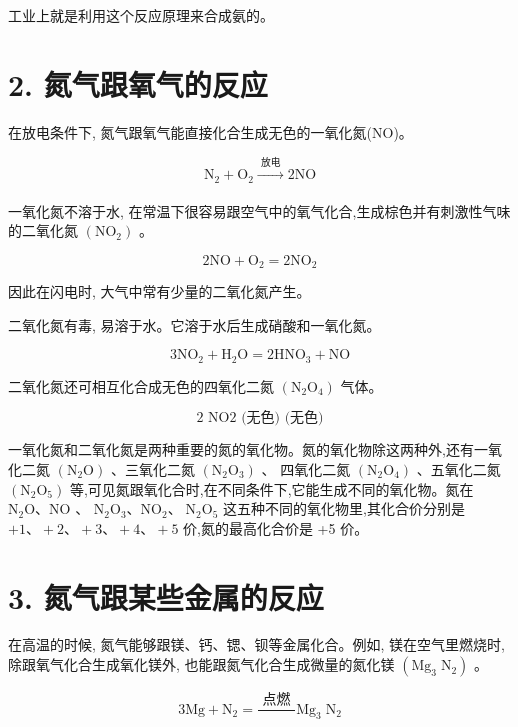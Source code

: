 \documentclass[10pt]{article}
\begin{document}
工业上就是利用这个反应原理来合成氨的。

\section*{2. 氮气跟氧气的反应}

在放电条件下, 氮气跟氧气能直接化合生成无色的一氧化氮(NO)。

\[
{\mathrm{N}}_{2} + {\mathrm{O}}_{2}\xrightarrow[]{\text{ 放电 }}2\mathrm{{NO}}
\]

一氧化氮不溶于水, 在常温下很容易跟空气中的氧气化合,生成棕色并有刺激性气味的二氧化氮 \(\left( {\mathrm{{NO}}}_{2}\right)\) 。

\[
2\mathrm{{NO}} + {\mathrm{O}}_{2} = 2{\mathrm{{NO}}}_{2}
\]

因此在闪电时, 大气中常有少量的二氧化氮产生。

二氧化氮有毒, 易溶于水。它溶于水后生成硝酸和一氧化氮。

\[
3{\mathrm{{NO}}}_{2} + {\mathrm{H}}_{2}\mathrm{O} = 2{\mathrm{{HNO}}}_{3} + \mathrm{{NO}}
\]

二氧化氮还可相互化合成无色的四氧化二氮 \(\left( {{\mathrm{N}}_{2}{\mathrm{O}}_{4}}\right)\) 气体。

\[
\text{2 NO2 (无色) (无色)}
\]

一氧化氮和二氧化氮是两种重要的氮的氧化物。氮的氧化物除这两种外,还有一氧化二氮 \(\left( {{\mathrm{N}}_{2}\mathrm{O}}\right)\) 、三氧化二氮 \(\left( {{\mathrm{N}}_{2}{\mathrm{O}}_{3}}\right)\) 、 四氧化二氮 \(\left( {{\mathrm{N}}_{2}{\mathrm{O}}_{4}}\right)\) 、五氧化二氮 \(\left( {{\mathrm{N}}_{2}{\mathrm{O}}_{5}}\right)\) 等,可见氮跟氧化合时,在不同条件下,它能生成不同的氧化物。氮在 \({\mathrm{N}}_{2}\mathrm{O}\text{、}\mathrm{{NO}}\) 、 \({\mathrm{N}}_{2}{\mathrm{O}}_{3}\text{、}{\mathrm{{NO}}}_{2}\text{、}{\mathrm{\;N}}_{2}{\mathrm{O}}_{5}\) 这五种不同的氧化物里,其化合价分别是 \(+ 1\text{、} + 2\text{、} + 3\text{、} + 4\text{、} + 5\) 价,氮的最高化合价是 +5 价。

\section*{3. 氮气跟某些金属的反应}

在高温的时候, 氮气能够跟镁、钙、锶、钡等金属化合。例如, 镁在空气里燃烧时, 除跟氧气化合生成氧化镁外, 也能跟氮气化合生成微量的氮化镁 \(\left( {{\mathrm{{Mg}}}_{3}{\mathrm{\;N}}_{2}}\right)\) 。

\[
3\mathrm{{Mg}} + {\mathrm{N}}_{2} = \frac{\text{ 点燃 }}{}{\mathrm{{Mg}}}_{3}{\mathrm{\;N}}_{2}
\]
\end{document}
